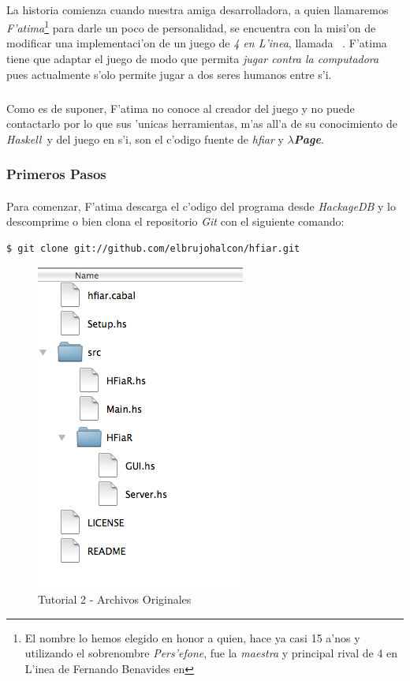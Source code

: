 \documentclass[a4paper]{article}
\newcommand{\haskell}{\textsl{Haskell}}
\newcommand{\hpage}{\textbf{\textsl{$\lambda$Page}}}
\begin{document}
\paragraph{}La historia comienza cuando nuestra amiga desarrolladora, a quien llamaremos \textsl{F'atima}\footnote{El nombre lo hemos elegido en honor a quien, hace ya casi 15 a'nos y utilizando el sobrenombre \textsl{Pers'efone}, fue la \textsl{maestra} y principal rival de 4 en L'inea de Fernando Benavides en } para darle un poco de personalidad, se encuentra con la misi'on de modificar una implementaci'on de un juego de \textsl{4 en L'inea}, llamada ~\cite{hfiar}.  F'atima tiene que adaptar el juego de modo que permita \textsl{jugar contra la computadora} pues actualmente s'olo permite jugar a dos seres humanos entre s'i.
\subparagraph{}Como es de suponer, F'atima no conoce al creador del juego y no puede contactarlo por lo que sus 'unicas herramientas, m'as all'a de su conocimiento de \haskell\ y del juego en s'i, son el c'odigo fuente de \textsl{hfiar} y \hpage.

\subsubsection{Primeros Pasos}
\paragraph{}Para comenzar, F'atima descarga el c'odigo del programa desde \textsl{HackageDB} y lo descomprime o bien clona el repositorio \textsl{Git} con el siguiente comando:
\lstset{language=sh, frame=single, tabsize=2}
\begin{center}\begin{lstlisting}
$ git clone git://github.com/elbrujohalcon/hfiar.git
\end{lstlisting}\end{center}
\begin{figure}[hp]
	\begin{center}
        	\includegraphics{pictures/tut2/00}
		\caption{Tutorial 2 - Archivos Originales}
		\label{tut200}
	\end{center}
\end{figure}
\end{document}
